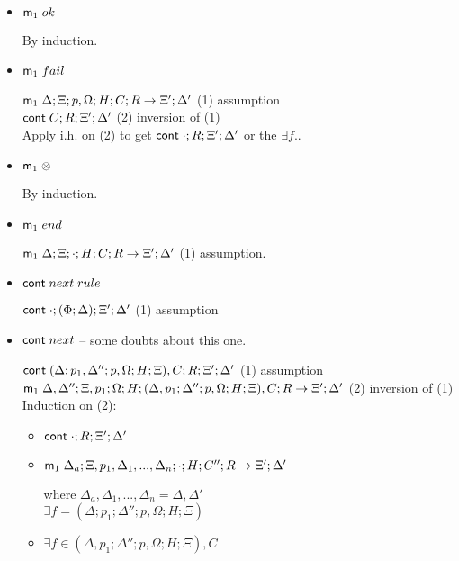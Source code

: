 \begin{itemize}
   \item $\mathsf{m}_1 \; ok$
   
   By induction.
   
   \item $\mathsf{m}_1 \; fail$
   
   $\mathsf{m}_1 \; \Delta; \Xi; p, \Omega; H; C; R \rightarrow \Xi'; \Delta'$ \hfill (1) assumption \\
   $\mathsf{cont} \; C; R; \Xi'; \Delta'$ \hfill (2) inversion of (1) \\
   Apply i.h. on (2) to get $\mathsf{cont} \; \cdot; R; \Xi'; \Delta'$ or the $\exists f.$.
   
   \item $\mathsf{m}_1 \; \otimes$
   
   By induction.
   
   \item $\mathsf{m}_1 \; end$
   
   $\mathsf{m}_1 \; \Delta; \Xi; \cdot; H; C; R \rightarrow \Xi'; \Delta'$ \hfill (1) assumption.\\
   
   \item $\mathsf{cont} \; next \; rule$
   
   $\mathsf{cont} \; \cdot; (\Phi; \Delta); \Xi'; \Delta'$ \hfill (1) assumption \\
   
   \item $\mathsf{cont} \; next$ -- some doubts about this one.
   
   $\mathsf{cont} \; (\Delta; p_1, \Delta''; p, \Omega; H; \Xi), C; R; \Xi'; \Delta'$ \hfill (1) assumption \\
   $\mathsf{m}_1 \; \Delta, \Delta''; \Xi, p_1;  \Omega; H; (\Delta, p_1; \Delta''; p, \Omega; H; \Xi), C; R \rightarrow \Xi'; \Delta'$ \hfill (2) inversion of (1)\\
   Induction on (2):
   
   \begin{itemize}
      \item $\mathsf{cont} \; \cdot; R; \Xi'; \Delta'$
      
      \item $\mathsf{m}_1 \; \Delta_a; \Xi, p_1, \Delta_1, ..., \Delta_n; \cdot; H; C''; R \rightarrow \Xi'; \Delta'$ 
      
      where $\Delta_a, \Delta_1, ..., \Delta_n = \Delta, \Delta'$ \\
      
      $\exists f = (\Delta; p_1; \Delta''; p, \Omega; H; \Xi)$
      
      \item $\exists f \in (\Delta, p_1; \Delta''; p, \Omega; H; \Xi), C$
      

\end{itemize}
\end{itemize}
